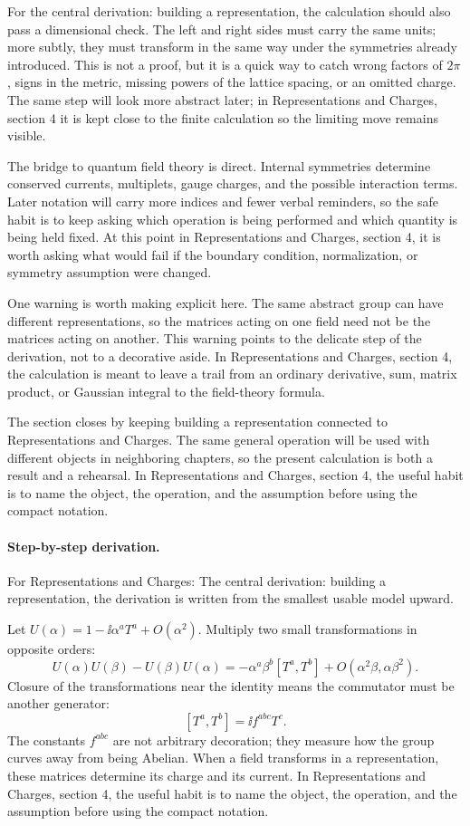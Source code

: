 For the central derivation: building a representation, the calculation should also pass a dimensional check.  The left and right sides must carry the same units; more subtly, they must transform in the same way under the symmetries already introduced.  This is not a proof, but it is a quick way to catch wrong factors of \(2\pi\), signs in the metric, missing powers of the lattice spacing, or an omitted charge.  The same step will look more abstract later; in Representations and Charges, section 4 it is kept close to the finite calculation so the limiting move remains visible.

The bridge to quantum field theory is direct.  Internal symmetries determine conserved currents, multiplets, gauge charges, and the possible interaction terms.  Later notation will carry more indices and fewer verbal reminders, so the safe habit is to keep asking which operation is being performed and which quantity is being held fixed.  At this point in Representations and Charges, section 4, it is worth asking what would fail if the boundary condition, normalization, or symmetry assumption were changed.

One warning is worth making explicit here.  The same abstract group can have different representations, so the matrices acting on one field need not be the matrices acting on another.  This warning points to the delicate step of the derivation, not to a decorative aside.  In Representations and Charges, section 4, the calculation is meant to leave a trail from an ordinary derivative, sum, matrix product, or Gaussian integral to the field-theory formula.

The section closes by keeping building a representation connected to Representations and Charges.  The same general operation will be used with different objects in neighboring chapters, so the present calculation is both a result and a rehearsal.  In Representations and Charges, section 4, the useful habit is to name the object, the operation, and the assumption before using the compact notation.



\paragraph{Step-by-step derivation.}

For Representations and Charges: The central derivation: building a representation, the derivation is written from the smallest usable model upward.

Let \(U(\alpha)=1-\ii\alpha^aT^a+O(\alpha^2)\).  Multiply two small transformations in opposite orders:
\[
  U(\alpha)U(\beta)-U(\beta)U(\alpha)
  =
  -\alpha^a\beta^b[T^a,T^b]+O(\alpha^2\beta,\alpha\beta^2).
\]
Closure of the transformations near the identity means the commutator must be another generator:
\[
  [T^a,T^b]=\ii f^{abc}T^c.
\]
The constants \(f^{abc}\) are not arbitrary decoration; they measure how the group curves away from being Abelian.  When a field transforms in a representation, these matrices determine its charge and its current.  In Representations and Charges, section 4, the useful habit is to name the object, the operation, and the assumption before using the compact notation.

